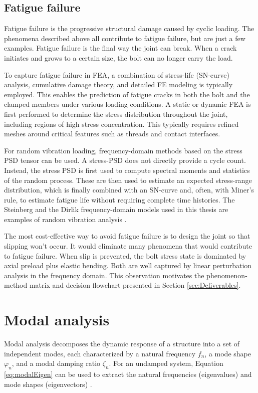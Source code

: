 \documentclass[a4paper,twoside]{bth}
\begin{document}
\newpage
\subsection{Fatigue failure}
Fatigue failure is the progressive structural damage caused by cyclic loading. The phenomena described above all contribute to fatigue failure, but are just a few examples. Fatigue failure is the final way the joint can break. When a crack initiates and grows to a certain size, the bolt can no longer carry the load.

To capture fatigue failure in \ac{FEA},  a combination of stress-life (SN-curve) analysis, cumulative damage theory, and detailed \ac{FE} modeling is typically employed. This enables the prediction of fatigue cracks in both the bolt and the clamped members under various loading conditions. A static or dynamic \ac{FEA} is first performed to determine the stress distribution throughout the joint, including regions of high stress concentration. This typically requires refined meshes around critical features such as threads and contact interfaces.


For random vibration loading, frequency-domain methods based on the stress \ac{PSD} tensor can be used. A stress-\ac{PSD} does not directly provide a cycle count. Instead, the stress \ac{PSD} is first used to compute spectral moments and statistics of the random process. These are then used to estimate an expected stress-range distribution, which is finally combined with an SN-curve and, often, with Miner's rule, to estimate fatigue life without requiring complete time histories. The Steinberg and the Dirlik frequency-domain models used in this thesis are examples of random vibration analysis \cite{dirlik_application_1985}.

The most cost-effective way to avoid fatigue failure is to design the joint so that slipping won't occur. It would eliminate many phenomena that would contribute to fatigue failure. When slip is prevented, the bolt stress state is dominated by axial preload plus elastic bending. Both are well captured by linear perturbation analysis in the frequency domain. This observation motivates the phenomenon-method matrix and decision flowchart presented in Section \ref{sec:Deliverables}.
\newpage
\section{Modal analysis}
Modal analysis decomposes the dynamic response of a structure into a set of independent modes, each characterized by a natural frequency $f_n$, a mode shape $\varphi_n$, and a modal damping ratio $\zeta_n$. For an undamped system, Equation \ref{eq:modalEigen} can be used to extract the natural frequencies (eigenvalues) and mode shapes (eigenvectors) \cite{33}. 
\end{document}
